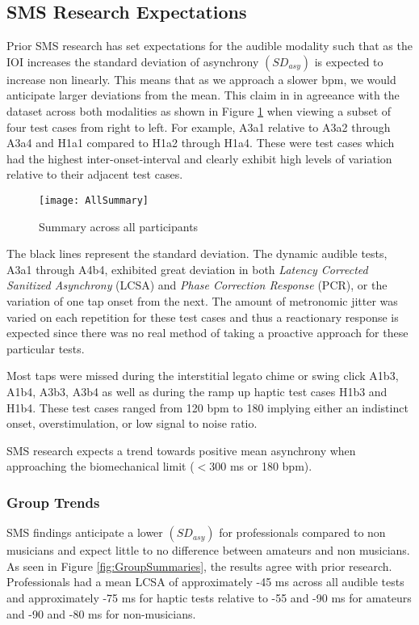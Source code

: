 \subsection{SMS Research Expectations}
Prior SMS research has set expectations for the audible modality such that as the IOI increases the standard deviation of asynchrony $(SD_{asy})$ is expected to increase non linearly. This means that as we approach a slower bpm, we would anticipate larger deviations from the mean. This claim in in agreeance with the dataset across both modalities as shown in Figure \ref{fig:AllSummary} when viewing a subset of four test cases from right to left. For example, A3a1 relative to A3a2 through A3a4 and H1a1 compared to H1a2 through H1a4. These were test cases which had the highest inter-onset-interval and clearly exhibit high levels of variation relative to their adjacent test cases.
\begin{figure}[H]
    \centering
    \texttt{[image: AllSummary]}
    \caption{Summary across all participants}
    \label{fig:AllSummary}
\end{figure}

The black lines represent the standard deviation. The dynamic audible tests, A3a1 through A4b4, exhibited great deviation in both \textit{Latency Corrected Sanitized Asynchrony} (LCSA) and \textit{Phase Correction Response} (PCR), or the variation of one tap onset from the next.  The amount of metronomic jitter was varied on each repetition for these test cases and thus a reactionary response is expected since there was no real method of taking a proactive approach for these particular tests.

Most taps were missed during the interstitial legato chime or swing click A1b3, A1b4, A3b3, A3b4 as well as during the ramp up haptic test cases H1b3 and H1b4. These test cases ranged from 120 bpm to 180 implying either an indistinct onset, overstimulation, or low signal to noise ratio.

SMS research expects a trend towards positive mean asynchrony when approaching the biomechanical limit ($<$300 ms or 180 bpm).


\subsubsection{Group Trends}
SMS findings anticipate a lower $(SD_{asy})$ for professionals compared to non musicians and expect little to no difference between amateurs and non musicians. As seen in Figure \ref{fig:GroupSummaries}, the results agree with prior research. Professionals had a mean LCSA of approximately -45 ms across all audible tests and approximately -75 ms for haptic tests relative to -55 and -90 ms for amateurs and -90 and -80 ms for non-musicians.

